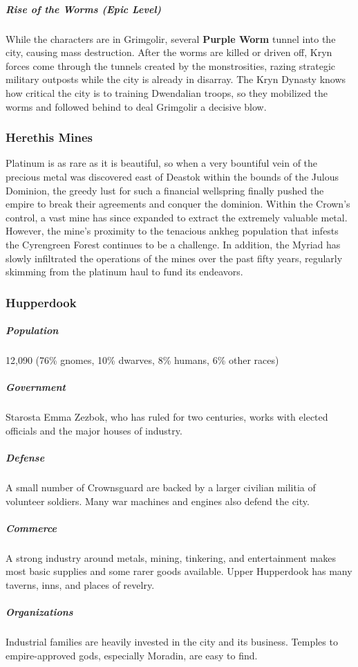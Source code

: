 \documentclass[10pt,a4paper,twoside,bg=print,twocolumn,openany,nodeprecatedcode]{dndbook}
\begin{document}
\subparagraph{Rise of the Worms (Epic Level)}
While the characters are in Grimgolir, several \textbf{Purple Worm} tunnel into the city, causing mass destruction. After the worms are killed or driven off, Kryn forces come through the tunnels created by the monstrosities, razing strategic military outposts while the city is already in disarray. The Kryn Dynasty knows how critical the city is to training Dwendalian troops, so they mobilized the worms and followed behind to deal Grimgolir a decisive blow.

\subsubsection{Herethis Mines}
Platinum is as rare as it is beautiful, so when a very bountiful vein of the precious metal was discovered east of Deastok within the bounds of the Julous Dominion, the greedy lust for such a financial wellspring finally pushed the empire to break their agreements and conquer the dominion. Within the Crown's control, a vast mine has since expanded to extract the extremely valuable metal. However, the mine's proximity to the tenacious ankheg population that infests the Cyrengreen Forest continues to be a challenge. In addition, the Myriad has slowly infiltrated the operations of the mines over the past fifty years, regularly skimming from the platinum haul to fund its endeavors.

\subsubsection{Hupperdook}
\subparagraph{Population}
12,090 (76\% gnomes, 10\% dwarves, 8\% humans, 6\% other races)

\subparagraph{Government}
Starosta Emma Zezbok, who has ruled for two centuries, works with elected officials and the major houses of industry.

\subparagraph{Defense}
A small number of Crownsguard are backed by a larger civilian militia of volunteer soldiers. Many war machines and engines also defend the city.

\subparagraph{Commerce}
A strong industry around metals, mining, tinkering, and entertainment makes most basic supplies and some rarer goods available. Upper Hupperdook has many taverns, inns, and places of revelry.

\subparagraph{Organizations}
Industrial families are heavily invested in the city and its business. Temples to empire-approved gods, especially Moradin, are easy to find.
\end{document}
